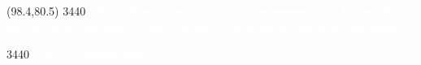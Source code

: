 \documentclass{beamer}
\makeatletter
\newcommand\Larger{\@setfontsize\Large{34}{40}}
\newcommand\mywt[1]{\textcolor{white}{#1}}
\makeatother
\begin{document}
\begin{textblock}{19.2}(98.4,80.5)
  \Larger{\mywt{\emph{``This pattern is common to all great programmers I know: they're not experts in something as much as experts in becoming experts in something.''}}}

  \Larger{\mywt{\hfill -- Andrei Alexandrescu}}
\end{textblock}

\end{document}
